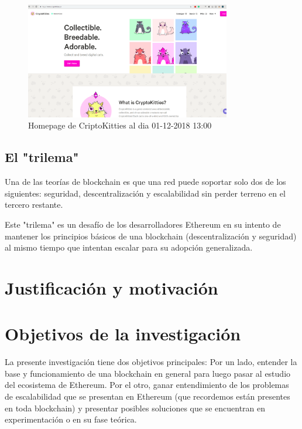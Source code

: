 \begin{figure}[htbp!] 
\centering    
\includegraphics[width=0.8\textwidth]{criptokittieshome}
\caption[CriptoKitties]{Homepage de CriptoKitties al dia 01-12-2018 13:00}
\label{fig:criptokitties-home}
\end{figure}

\subsection{El "trilema"}
Una de las teorías de blockchain es que una red puede soportar solo dos de los siguientes:
seguridad, descentralización y escalabilidad sin perder terreno en el tercero restante.

Este "trilema" es un desafío de los desarrolladores Ethereum en su intento de mantener los
principios
básicos de una blockchain (descentralización y seguridad) al mismo tiempo que intentan escalar para
su adopción generalizada.



\section{Justificación y motivación} %


\section{Objetivos de la investigación}
La presente investigación tiene dos objetivos principales: Por un lado, entender la base y funcionamiento
de una blockchain en general para luego pasar al estudio del ecosistema de Ethereum. Por el otro, ganar
entendimiento de los problemas de escalabilidad que se presentan en Ethereum (que recordemos están
presentes en toda blockchain) y presentar posibles soluciones que se encuentran en experimentación o en su
fase teórica.

